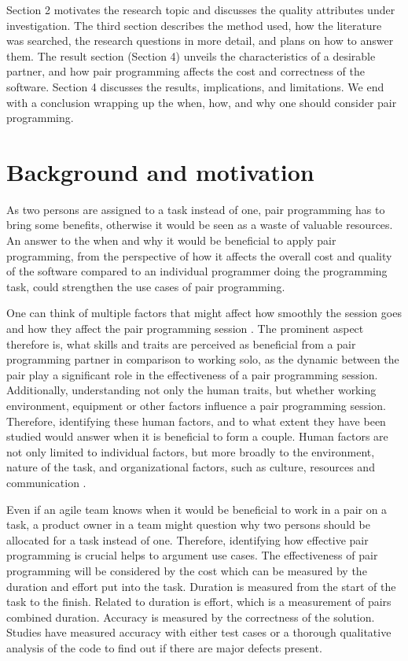 \documentclass[conference]{IEEEtran}
\begin{document}
Section 2 motivates the research topic and discusses the quality attributes under investigation. The third section describes the method used, how the literature was searched, the research questions in more detail, and plans on how to answer them. The result section (Section 4) unveils the characteristics of a desirable partner, and how pair programming affects the cost and correctness of the software. Section 4 discusses the results, implications, and limitations. We end with a conclusion wrapping up the when, how, and why one should consider pair programming.

\section{Background and motivation}

As two persons are assigned to a task instead of one, pair programming has to bring some benefits, otherwise it would be seen as a waste of valuable resources. An answer to the when and why it would be beneficial to apply pair programming, from the perspective of how it affects the overall cost and quality of the software compared to an individual programmer doing the programming task, could strengthen the use cases of pair programming.

One can think of multiple factors that might affect how smoothly the session goes and how they affect the pair programming session \cite{10.1145/1414004.1414026}. The prominent aspect therefore is, what skills and traits are perceived as beneficial from a pair programming partner in comparison to working solo, as the dynamic between the pair play a significant role in the effectiveness of a pair programming session. Additionally, understanding not only the human traits, but whether working environment, equipment or other factors influence a pair programming session. Therefore, identifying these human factors, and to what extent they have been studied would answer when it is beneficial to form a couple. Human factors are not only limited to individual factors, but more broadly to the environment, nature of the task, and organizational factors, such as culture, resources and communication \cite{hseIntroductionHuman}.

Even if an agile team knows when it would be beneficial to work in a pair on a task, a product owner in a team might question why two persons should be allocated for a task instead of one. Therefore, identifying how effective pair programming is crucial helps to argument use cases. The effectiveness of pair programming will be considered by the cost which can be measured by the duration and effort put into the task. Duration is measured from the start of the task to the finish. Related to duration is effort, which is a measurement of pairs combined duration. Accuracy is measured by the correctness of the solution. Studies have measured accuracy with either test cases or a thorough qualitative analysis of the code to find out if there are major defects present. 
\end{document}
